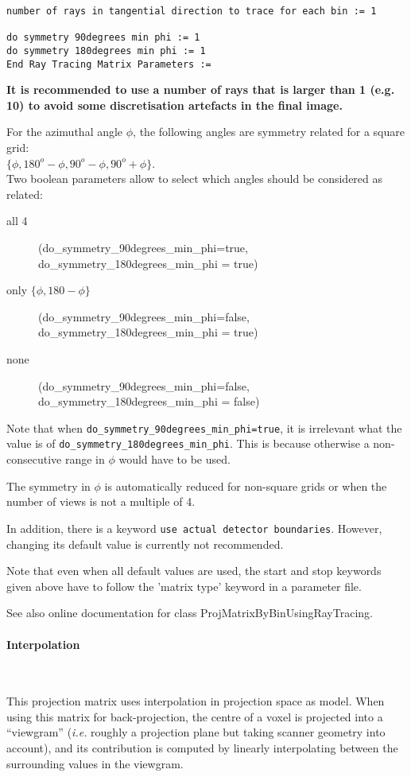 \documentclass{article}
\newcommand{\subsubsubsection}[1]{\paragraph{#1}\mbox{} \\}
\begin{document}
{{{\begin{verbatim}
number of rays in tangential direction to trace for each bin := 1

do symmetry 90degrees min phi := 1 
do symmetry 180degrees min phi := 1
End Ray Tracing Matrix Parameters :=
\end{verbatim}

\textbf{It is recommended to use a number of rays that is larger than 1 (e.g. 10) to
avoid some discretisation artefacts in the final image.}

For the azimuthal angle $\phi$, the following angles are symmetry 
related for a square grid: \\
$\{\phi, 180^{o}-\phi, 90^{o}-\phi, 90^{o}+\phi\}$.\\
Two boolean parameters allow to select which angles should be 
considered as related:
\begin{description}
\item[all 4]
  (do\_symmetry\_90degrees\_min\_phi=true,  \\
do\_symmetry\_180degrees\_min\_phi = true)
\item[only $\{ \phi, 180- \phi \}$]
(do\_symmetry\_90degrees\_min\_phi=false,  \\
do\_symmetry\_180degrees\_min\_phi = true)
\item[none]
(do\_symmetry\_90degrees\_min\_phi=false, \\
do\_symmetry\_180degrees\_min\_phi = false)
\end{description}

Note that when \texttt{do\_symmetry\_90degrees\_min\_phi=true}, 
it is irrelevant what the value is 
of \texttt{do\_symmetry\_180degrees\_min\_phi}. This is because 
otherwise a non-consecutive range in $\phi$ would have to be used.


The symmetry in $\phi$ is automatically reduced for non-square grids 
or when the number of views is not a multiple of 4.



In addition, there is a keyword \texttt{use actual detector boundaries}. 
However, changing its default value is currently not recommended. 




Note that even when all default values are used, the start and 
stop keywords given above have to follow the 'matrix type' keyword 
in a parameter file.


See also online documentation for class ProjMatrixByBinUsingRayTracing. 


{ \subsubsubsection{Interpolation}
}
\label{sec:projmatrixusinginterpolation}
This projection matrix uses interpolation in projection space as model. 
When using this matrix for back-projection, the centre of a voxel is projected 
into a ``viewgram'' (\textit{i.e.} roughly a projection plane but taking scanner 
geometry into account), and its contribution is computed by linearly interpolating
between the surrounding values in the viewgram.

}}}
\end{document}
